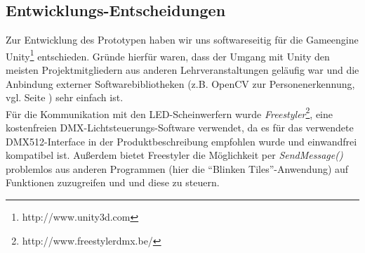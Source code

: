 \subsection{Entwicklungs-Entscheidungen}\label{ssec:entscheidungen}

Zur Entwicklung des Prototypen haben wir uns softwareseitig für die Gameengine Unity\footnote{http://www.unity3d.com} entschieden.
Gründe hierfür waren, dass der Umgang mit Unity den meisten Projektmitgliedern aus anderen Lehrveranstaltungen geläufig war und die Anbindung externer Softwarebibliotheken (z.B. OpenCV zur Personenerkennung, vgl. Seite \pageref{chp:objdet}) sehr einfach ist.\\
Für die Kommunikation mit den LED-Scheinwerfern wurde \emph{Freestyler}\footnote{http://www.freestylerdmx.be/}, eine kostenfreien DMX-Lichtsteuerungs-Software verwendet, da es für das verwendete DMX512-Interface in der Produktbeschreibung empfohlen wurde und einwandfrei kompatibel ist. Außerdem bietet Freestyler die Möglichkeit per \emph{SendMessage()} problemlos aus anderen Programmen (hier die \enquote{Blinken Tiles}-Anwendung) auf Funktionen zuzugreifen und und diese zu steuern.